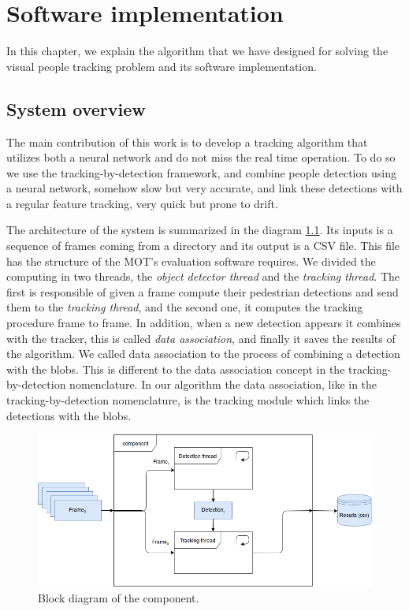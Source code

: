 \chapter{Software implementation}\label{cap.software}

In this chapter, we explain the algorithm that we have designed for solving the visual people tracking problem and its software implementation. 

\section{System overview}

The main contribution of this work is to develop a tracking algorithm that utilizes both a neural network and do not miss the real time operation. To do so we use the tracking-by-detection framework, and combine people detection using a neural network, somehow slow but very accurate, and link these detections with a regular feature tracking, very quick but prone to drift. 

The architecture of the system is summarized in the diagram \ref{software1}. Its inputs is a sequence of frames coming from a directory and its output is a CSV file. This file has the structure of the MOT's evaluation software requires. We divided the computing in two threads, the \textit{object detector thread} and the \textit{tracking thread}. The first is responsible of given a frame compute their pedestrian detections and send them to the \textit{tracking thread}, and the second one, it computes the tracking procedure frame to frame. In addition, when a new detection appears it combines with the tracker, this is called \textit{data association}, and finally it saves the results of the algorithm. We called data association to the process of combining a detection with the blobs. This is different to the data association concept in the tracking-by-detection nomenclature. In our algorithm the data association, like in the tracking-by-detection nomenclature, is the tracking module which links the detections with the blobs.



\begin{figure}[H]
\centering         
\includegraphics[width=12cm]{flows/bloque.png}
\caption{Block diagram of the component.} \label{software1}
\end{figure}


